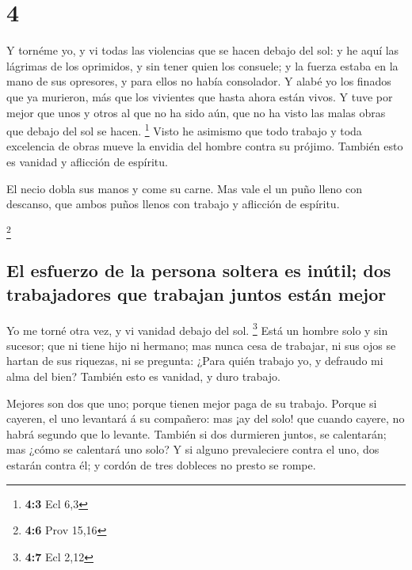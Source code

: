 \hypertarget{section-3}{%
\section{4}\label{section-3}}

 Y tornéme yo, y vi todas las violencias que se hacen debajo
del sol: y he aquí las lágrimas de los oprimidos, y sin tener quien los
consuele; y la fuerza estaba en la mano de sus opresores, y para ellos
no había consolador.  Y alabé yo los finados que ya
murieron, más que los vivientes que hasta ahora están vivos.
 Y tuve por mejor que unos y otros al que no ha sido aún,
que no ha visto las malas obras que debajo del sol se hacen. \footnote{\textbf{4:3}
  Ecl 6,3}  Visto he asimismo que todo trabajo y toda
excelencia de obras mueve la envidia del hombre contra su prójimo.
También esto es vanidad y aflicción de espíritu.

 El necio dobla sus manos y come su carne.  Mas
vale el un puño lleno con descanso, que ambos puños llenos con trabajo y
aflicción de espíritu.

\footnote{\textbf{4:6} Prov 15,16}

\hypertarget{el-esfuerzo-de-la-persona-soltera-es-inuxfatil-dos-trabajadores-que-trabajan-juntos-estuxe1n-mejor}{%
\subsection{El esfuerzo de la persona soltera es inútil; dos
trabajadores que trabajan juntos están
mejor}\label{el-esfuerzo-de-la-persona-soltera-es-inuxfatil-dos-trabajadores-que-trabajan-juntos-estuxe1n-mejor}}

 Yo me torné otra vez, y vi vanidad debajo del sol.
\footnote{\textbf{4:7} Ecl 2,12}  Está un hombre solo y sin
sucesor; que ni tiene hijo ni hermano; mas nunca cesa de trabajar, ni
sus ojos se hartan de sus riquezas, ni se pregunta: ¿Para quién trabajo
yo, y defraudo mi alma del bien? También esto es vanidad, y duro
trabajo.

 Mejores son dos que uno; porque tienen mejor paga de su
trabajo.  Porque si cayeren, el uno levantará á su
compañero: mas ¡ay del solo! que cuando cayere, no habrá segundo que lo
levante.  También si dos durmieren juntos, se calentarán;
mas ¿cómo se calentará uno solo?  Y si alguno prevaleciere
contra el uno, dos estarán contra él; y cordón de tres dobleces no
presto se rompe.

